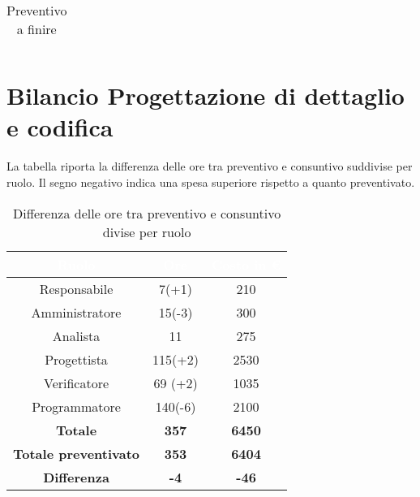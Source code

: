 \begin{flushleft}
\begin{table}[H]
\begin{center}
\begin{tabular}{ccc}
		\end{tabular}
  
		\caption{Preventivo a finire} 
  
	\end{center}
  
\end{table}
\newpage
\section{Bilancio Progettazione di dettaglio e codifica}\label{BilProgDC}
La tabella riporta la differenza delle ore tra preventivo e consuntivo suddivise per ruolo. Il segno negativo indica una spesa superiore rispetto a quanto preventivato.\\
		\begin{table}[H]
		\begin{center}
			\begin{tabular}{ccc}
				\rowcolor{coolblack}
				\hline
				\textcolor{white}{Ruolo} & \textcolor{white}{Ore} & \textcolor{white}{Costo in \euro}\\
				\hline
				Responsabile   & 7(+1)	&  	210 	\\ 
				Amministratore & 15(-3)	&  	300 	\\ 
				Analista       & 11 &   275\\ 
				Progettista    & 115(+2)&   2530	\\ 
				Verificatore   & 69	(+2)&  	1035	\\ 
				Programmatore  & 140(-6)&   2100	\\ \hline
				\textbf{Totale}& \textbf{357} & \textbf{6450}	\\ \hline 
				\textbf{Totale preventivato}& \textbf{353} & \textbf{6404}\\ \hline 
				\textbf{Differenza}& \textbf{-4} & \textbf{-46}	\\ \hline  
			\end{tabular}
			
			\caption{Differenza delle ore tra preventivo e consuntivo divise per ruolo} 
		\end{center}
	\end{table}

	
	
	\begin{table}[H]
		\begin{center}
			\begin{tabularx}{\textwidth}{|c|cccccc|c|}
				

\end{tabularx}
\end{center}
\end{table}
\end{flushleft}
